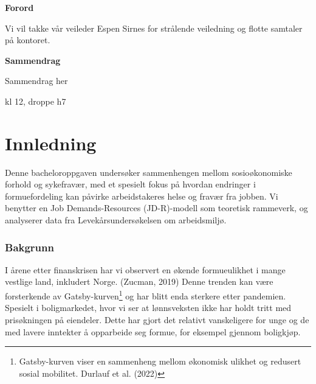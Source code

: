 \documentclass[
  12pt,
  a4paper,
  DIV=11,
  numbers=noendperiod]{scrartcl}
\renewcommand*\contentsname{Table of contents}
\newcommand\contentsname{Table of contents}
\begin{document}




\thispagestyle{plain}
\begin{center}
    \Large
    \textbf{Forord}
\end{center}

Vi vil takke vår veileder Espen Sirnes for strålende veiledning og
flotte samtaler på kontoret.

\newpage
\hypersetup{linkcolor=black}
\renewcommand{\contentsname}{Innholdsfortegnelse}
\renewcommand*{\figureautorefname}{Figur}
\renewcommand*{\tableautorefname}{Tabell}
\renewcommand*{\equationautorefname}{Ligning:}
\tableofcontents
\listoffigures
\listoftables
\hypersetup{linkcolor=blue}
\newpage
\thispagestyle{plain}
\begin{center}
    \Large
    \textbf{Sammendrag}
\end{center}

Sammendrag her

kl 12, droppe h7

\newpage

\section{Innledning}\label{innledning}

Denne bacheloroppgaven undersøker sammenhengen mellom sosioøkonomiske
forhold og sykefravær, med et spesielt fokus på hvordan endringer i
formuefordeling kan påvirke arbeidstakeres helse og fravær fra jobben.
Vi benytter en Job Demands-Resources (JD-R)-modell som teoretisk
rammeverk, og analyserer data fra Levekårsundersøkelsen om arbeidsmiljø.

\subsubsection{Bakgrunn}\label{bakgrunn}

I årene etter finanskrisen har vi observert en økende formueulikhet i
mange vestlige land, inkludert Norge. (Zucman, 2019) Denne trenden kan
være forsterkende av Gatsby-kurven\footnote{Gatsby-kurven viser en
  sammenheng mellom økonomisk ulikhet og redusert sosial mobilitet.
  Durlauf et al. (2022)} og har blitt enda sterkere etter pandemien.
Spesielt i boligmarkedet, hvor vi ser at lønnsveksten ikke har holdt
tritt med prisøkningen på eiendeler. Dette har gjort det relativt
vanskeligere for unge og de med lavere inntekter å opparbeide seg
formue, for eksempel gjennom boligkjøp.
\end{document}
